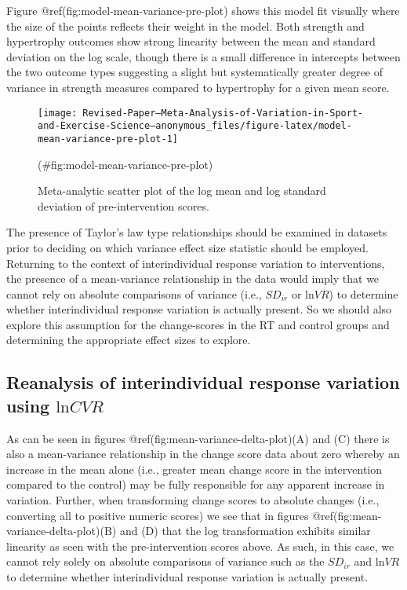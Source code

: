 \documentclass[
]{article}
\begin{document}
Figure @ref(fig:model-mean-variance-pre-plot) shows this model fit visually where the size of the points reflects their weight in the model. Both strength and hypertrophy outcomes show strong linearity between the mean and standard deviation on the log scale, though there is a small difference in intercepts between the two outcome types suggesting a slight but systematically greater degree of variance in strength measures compared to hypertrophy for a given mean score.

\begin{figure}

{\centering \texttt{[image: Revised-Paper---Meta-Analysis-of-Variation-in-Sport-and-Exercise-Science---anonymous\_files/figure-latex/model-mean-variance-pre-plot-1]} 

}

\caption{Meta-analytic scatter plot of the log mean and log standard deviation of pre-intervention scores.}(\#fig:model-mean-variance-pre-plot)
\end{figure}

The presence of Taylor's law type relationships should be examined in datasets prior to deciding on which variance effect size statistic should be employed. Returning to the context of interindividual response variation to interventions, the presence of a mean-variance relationship in the data would imply that we cannot rely on absolute comparisons of variance (i.e., \(SD_{ir}\) or \(\textrm{ln}VR\)) to determine whether interindividual response variation is actually present. So we should also explore this assumption for the change-scores in the RT and control groups and determining the appropriate effect sizes to explore.

\hypertarget{reanalysis-of-interindividual-response-variation-using-textrmlncvr}{%
\subsection{\texorpdfstring{Reanalysis of interindividual response variation using \(\textrm{ln}CVR\)}{Reanalysis of interindividual response variation using \textbackslash textrm\{ln\}CVR}}\label{reanalysis-of-interindividual-response-variation-using-textrmlncvr}}

As can be seen in figures @ref(fig:mean-variance-delta-plot)(A) and (C) there is also a mean-variance relationship in the change score data about zero whereby an increase in the mean alone (i.e., greater mean change score in the intervention compared to the control) may be fully responsible for any apparent increase in variation. Further, when transforming change scores to absolute changes (i.e., converting all to positive numeric scores) we see that in figures @ref(fig:mean-variance-delta-plot)(B) and (D) that the log transformation exhibits similar linearity as seen with the pre-intervention scores above. As such, in this case, we cannot rely solely on absolute comparisons of variance such as the \(SD_{ir}\) and \(\textrm{ln}VR\) to determine whether interindividual response variation is actually present.
\end{document}
